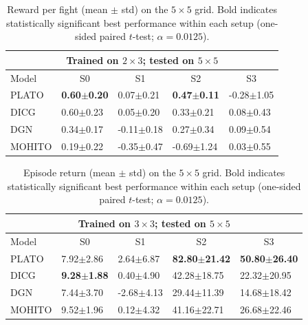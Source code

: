 \begin{table}[t]
\centering
\small
\setlength{\tabcolsep}{2.5pt}
\renewcommand{\arraystretch}{1.03}
\begin{tabular}{l|l|l|l|l}
\toprule
\multicolumn{5}{c}{Trained on $2\times 3$; tested on $5\times 5$} \\
\midrule
Model & \multicolumn{1}{c|}{S0} & \multicolumn{1}{c|}{S1} & \multicolumn{1}{c|}{S2} & \multicolumn{1}{c}{S3} \\
\midrule
PLATO & \textbf{0.60$\pm$0.20} & 0.07$\pm$0.21 & \textbf{0.47$\pm$0.11} & -0.28$\pm$1.05 \\
DICG & 0.60$\pm$0.23 & 0.05$\pm$0.20 & 0.33$\pm$0.21 & 0.08$\pm$0.43 \\
DGN & 0.34$\pm$0.17 & -0.11$\pm$0.18 & 0.27$\pm$0.34 & 0.09$\pm$0.54 \\
MOHITO  & 0.19$\pm$0.22 & -0.35$\pm$0.47 & -0.69$\pm$1.24 & 0.03$\pm$0.55 \\
\bottomrule
\end{tabular}
\caption{Reward per fight (mean $\pm$ std) on the $5\times 5$ grid. Bold indicates statistically significant best performance within each setup (one-sided paired $t$-test; $\alpha=0.0125$).}
\label{tab:zs_rpf_5x5}
\end{table}






\begin{table}[t]
\centering
\small
\setlength{\tabcolsep}{2.5pt}
\renewcommand{\arraystretch}{1.03}
\begin{tabular}{l|l|l|l|l}
\toprule
\multicolumn{5}{c}{Trained on $3\times 3$; tested on $5\times 5$} \\
\midrule
Model & \multicolumn{1}{c|}{S0} & \multicolumn{1}{c|}{S1} & \multicolumn{1}{c|}{S2} & \multicolumn{1}{c}{S3} \\
\midrule
PLATO & 7.92$\pm$2.86 & 2.64$\pm$6.87 & \textbf{82.80$\pm$21.42} & \textbf{50.80$\pm$26.40} \\
DICG & \textbf{9.28$\pm$1.88} & 0.40$\pm$4.90 & 42.28$\pm$18.75 & 22.32$\pm$20.95 \\
DGN & 7.44$\pm$3.70 & -2.68$\pm$4.13 & 29.44$\pm$11.39 & 14.68$\pm$18.42 \\
MOHITO  & 9.52$\pm$1.96 & 0.12$\pm$4.32 & 41.16$\pm$22.71 & 26.68$\pm$22.46 \\
\bottomrule
\end{tabular}
\caption{Episode return (mean $\pm$ std) on the $5\times 5$ grid. Bold indicates statistically significant best performance within each setup (one-sided paired $t$-test; $\alpha=0.0125$).}
\label{tab:zs_reward_5x5_from_3x3}
\end{table}



